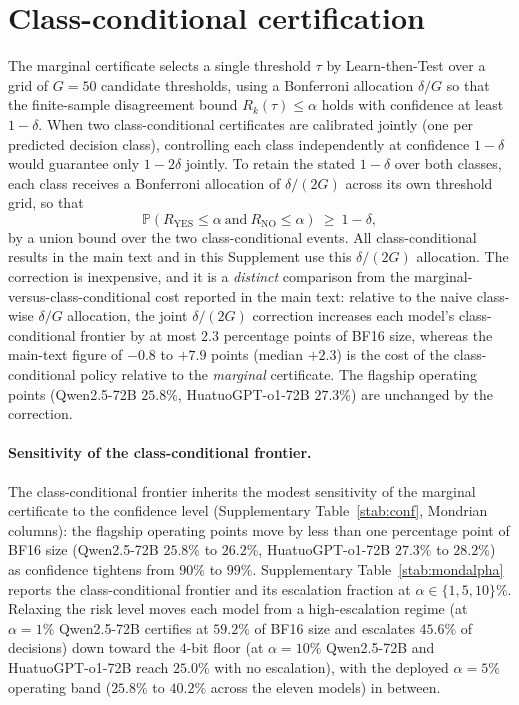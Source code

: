 \documentclass[11pt]{article}
\theoremstyle{plain}
\newcommand{\YES}{\mathrm{YES}}
\newcommand{\NO}{\mathrm{NO}}
\newcommand{\Prob}{\mathbb{P}}
\begin{document}
\section{Class-conditional certification}
The marginal certificate selects a single threshold $\tau$ by Learn-then-Test over a grid of
$G=50$ candidate thresholds, using a Bonferroni allocation $\delta/G$ so that the finite-sample
disagreement bound $R_k(\tau)\le\alpha$ holds with confidence at least $1-\delta$. When two
class-conditional certificates are calibrated jointly (one per predicted decision class), controlling
each class independently at confidence $1-\delta$ would guarantee only $1-2\delta$ jointly. To retain
the stated $1-\delta$ over both classes, each class receives a Bonferroni allocation of $\delta/(2G)$
across its own threshold grid, so that
\begin{equation}
\Prob\!\left(R_{\YES}\le\alpha \ \text{and}\ R_{\NO}\le\alpha\right)\ \ge\ 1-\delta ,
\end{equation}
by a union bound over the two class-conditional events. All class-conditional results in the main
text and in this Supplement use this $\delta/(2G)$ allocation. The correction is inexpensive, and it is a
\emph{distinct} comparison from the marginal-versus-class-conditional cost reported in the main text:
relative to the naive class-wise $\delta/G$ allocation, the joint $\delta/(2G)$ correction increases
each model's class-conditional frontier by at most $2.3$ percentage points of BF16 size, whereas the
main-text figure of $-0.8$ to $+7.9$ points (median $+2.3$) is the cost of the class-conditional
policy relative to the \emph{marginal} certificate. The flagship operating points (Qwen2.5-72B
$25.8\%$, HuatuoGPT-o1-72B $27.3\%$) are unchanged by the correction.

\paragraph{Sensitivity of the class-conditional frontier.} The class-conditional frontier inherits the
modest sensitivity of the marginal certificate to the confidence level (Supplementary
Table~\ref{stab:conf}, Mondrian columns): the flagship operating points move by less than one
percentage point of BF16 size (Qwen2.5-72B $25.8\%$ to $26.2\%$, HuatuoGPT-o1-72B $27.3\%$ to
$28.2\%$) as confidence tightens from $90\%$ to $99\%$. Supplementary Table~\ref{stab:mondalpha}
reports the class-conditional frontier and its escalation fraction at $\alpha\in\{1,5,10\}\%$. Relaxing
the risk level moves each model from a high-escalation regime (at $\alpha=1\%$ Qwen2.5-72B certifies
at $59.2\%$ of BF16 size and escalates $45.6\%$ of decisions) down toward the $4$-bit floor (at
$\alpha=10\%$ Qwen2.5-72B and HuatuoGPT-o1-72B reach $25.0\%$ with no escalation), with the deployed
$\alpha=5\%$ operating band ($25.8\%$ to $40.2\%$ across the eleven models) in between.
\end{document}
